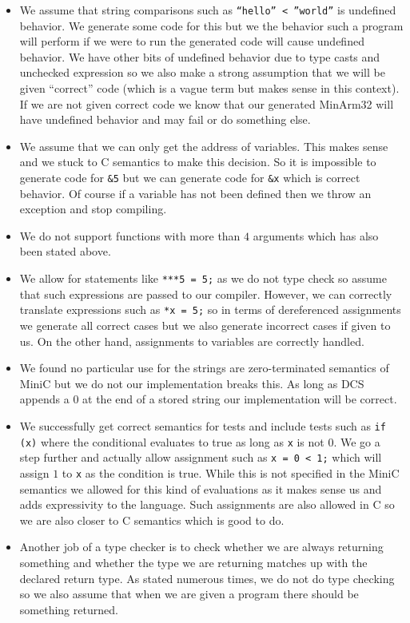 \documentclass{article}
\begin{document}
\begin{itemize}
    \item We assume that string comparisons such as \texttt{``hello'' < ''world''} is undefined behavior. We generate some code for this but we the behavior such a program will perform if we were to run the generated code will cause undefined behavior. We have other bits of undefined behavior due to type casts and unchecked expression so we also make a strong assumption that we will be given ``correct'' code (which is a vague term but makes sense in this context). If we are not given correct code we know that our generated MinArm32 will have undefined behavior and may fail or do something else.
    \item We assume that we can only get the address of variables. This makes sense and we stuck to C semantics to make this decision. So it is impossible to generate code for \texttt{\&5} but we can generate code for \texttt{\&x} which is correct behavior. Of course if a variable has not been defined then we throw an exception and stop compiling.
    \item We do not support functions with more than $4$ arguments which has also been stated above.
    \item We allow for statements like \texttt{***5 = 5;} as we do not type check so assume that such expressions are passed to our compiler. However, we can correctly translate expressions such as \texttt{*x = 5;} so in terms of dereferenced assignments we generate all correct cases but we also generate incorrect cases if given to us. On the other hand, assignments to variables are correctly handled.
    \item We found no particular use for the strings are zero-terminated semantics of MiniC but we do not our implementation breaks this. As long as DCS appends a $0$ at the end of a stored string our implementation will be correct.
    \item We successfully get correct semantics for tests and include tests such as \texttt{if (x)} where the conditional evaluates to true as long as \texttt{x} is not $0$. We go a step further and actually allow assignment such as \texttt{x = 0 < 1;} which will assign $1$ to \texttt{x} as the condition is true. While this is not specified in the MiniC semantics we allowed for this kind of evaluations as it makes sense us and adds expressivity to the language. Such assignments are also allowed in C so we are also closer to C semantics which is good to do.
    \item Another job of a type checker is to check whether we are always returning something and whether the type we are returning matches up with the declared return type. As stated numerous times, we do not do type checking so we also assume that when we are given a program there should be something returned.

\end{itemize}
\end{document}
